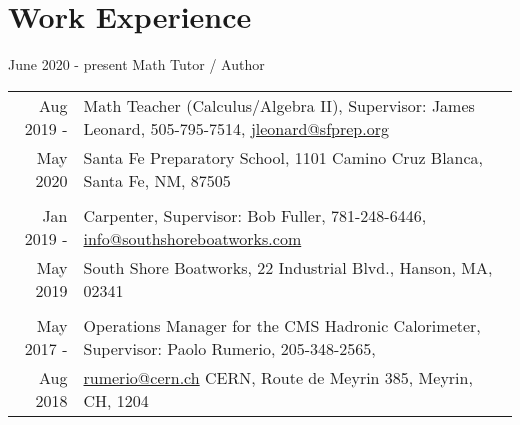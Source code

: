 \documentclass[10pt]{article} %
\begin{document}
\section{Work Experience}

June 2020 - present Math Tutor / Author \\

\begin{tabulary}{\textwidth}{RL}	
%

Aug 2019 -     & Math Teacher (Calculus/Algebra II), Supervisor: James Leonard, 505-795-7514, \href{mailto:jleonard@sfprep.org}{jleonard@sfprep.org} \\
 May 2020       & Santa Fe Preparatory School, 1101 Camino Cruz Blanca, Santa Fe, NM, 87505 \\ %

\vspace{5pt} \\

Jan 2019 -     & Carpenter, Supervisor: Bob Fuller, 781-248-6446, \href{mailto:info@southshoreboatworks.com}{info@southshoreboatworks.com} \\
 May 2019      & South Shore Boatworks, 22 Industrial Blvd., Hanson, MA, 02341 \\ %

\vspace{5pt} \\

May 2017 -     & Operations Manager for the CMS Hadronic Calorimeter, Supervisor: Paolo Rumerio, 205-348-2565, \\
 Aug 2018      & \href{mailto:rumerio@cern.ch}{rumerio@cern.ch} CERN, Route de Meyrin 385, Meyrin, CH, 1204 \\ %


\end{tabulary}
\end{document}
